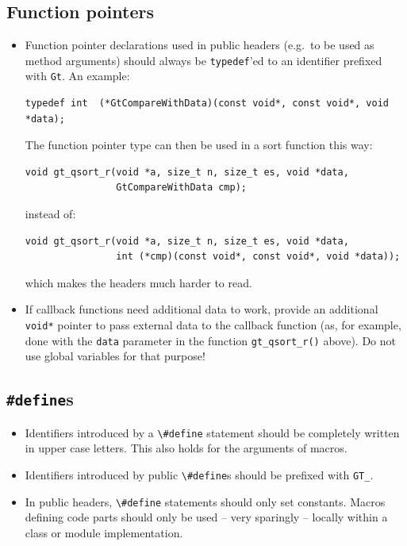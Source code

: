 \documentclass[11pt,final]{article}
\newcommand{\keyword}[1]{\lstinline{#1}}
\begin{document}
\subsection{Function pointers}
\begin{itemize}
\item
Function pointer declarations used in public headers (e.g.\ to be used as method
arguments) should always be \keyword{typedef}'ed to an identifier prefixed with
\keyword{Gt}. An example:
\begin{lstlisting}
typedef int  (*GtCompareWithData)(const void*, const void*, void *data);
\end{lstlisting}

The function pointer type can then be used in a sort function this way:

\begin{lstlisting}
void gt_qsort_r(void *a, size_t n, size_t es, void *data,
                GtCompareWithData cmp);
\end{lstlisting}

instead of:

\begin{lstlisting}
void gt_qsort_r(void *a, size_t n, size_t es, void *data,
                int (*cmp)(const void*, const void*, void *data));
\end{lstlisting}

which makes the headers much harder to read.
\item
If callback functions need additional data to work, provide an additional
\keyword{void*} pointer to pass external data to the callback function
(as, for example, done with the \keyword{data} parameter in the function
\keyword{gt_qsort_r()} above). Do not use global variables for that purpose!
\end{itemize}

\subsection{\texttt{\#define}s}
\begin{itemize}
\item
Identifiers introduced by a \keyword{\#define} statement should be completely
written in upper case letters. This also holds for the arguments of
macros.
\item
Identifiers introduced by public \keyword{\#define}s should be prefixed with
\keyword{GT_}.
\item
In public headers, \keyword{\#define} statements should only set constants.
Macros defining code parts should only be used -- very sparingly -- locally
within a class or module implementation.
\end{itemize}
\end{document}
